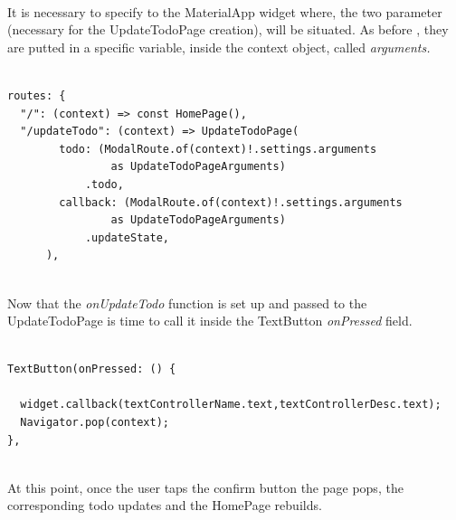 \mbox{}\\
It is necessary to specify to the MaterialApp widget where, the two parameter (necessary for the UpdateTodoPage creation), will be situated. As before , they are putted in a specific variable, inside the context object, called \textit{arguments.}
\mbox{}\\
\begin{code}

\mbox{}
\label{code:2.42}
\begin{verbatim}

routes: {
  "/": (context) => const HomePage(),
  "/updateTodo": (context) => UpdateTodoPage(
        todo: (ModalRoute.of(context)!.settings.arguments
                as UpdateTodoPageArguments)
            .todo,
        callback: (ModalRoute.of(context)!.settings.arguments
                as UpdateTodoPageArguments)
            .updateState,
      ),
\end{verbatim}
\end{code}
\mbox{}\\
Now that the \textit{onUpdateTodo } function is set up and  passed to the UpdateTodoPage is  time to call it inside the TextButton \textit{onPressed  }field.
\mbox{}\\
\begin{code}

\mbox{}
\label{code:2.43}
\begin{verbatim}

TextButton(onPressed: () {

  widget.callback(textControllerName.text,textControllerDesc.text);
  Navigator.pop(context);
},
\end{verbatim}
\end{code}
\mbox{}\\
At this point, once the user taps the confirm button the page pops, the corresponding todo updates and the HomePage rebuilds.\\



